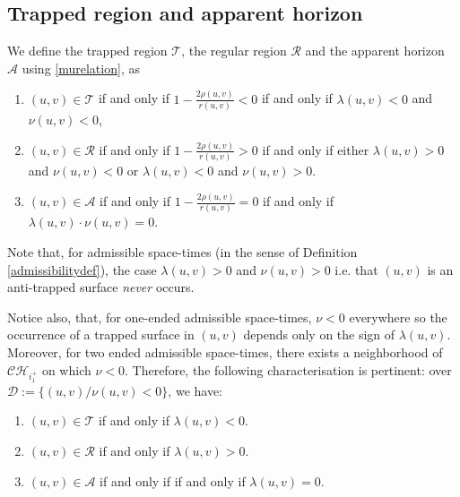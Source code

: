 \documentclass[10pt,a4paper]{article}
\theoremstyle{plain}
\theoremstyle{remark}
\newcommand{\A}{\mathcal{A}}
\newcommand{\R}{\mathcal{R}}
\newcommand{\T}{\mathcal{T}}
\theoremstyle{definition}
\theoremstyle{plain}
\theoremstyle{remark}
\theoremstyle{definition}
\numberwithin{equation}{section}
\begin{document}

\subsection{Trapped region and apparent horizon}


We define the trapped region $\mathcal{T}$, the regular region $\R$ and the apparent horizon $\A$ using \eqref{murelation}, as
\begin{enumerate}
	\item  \label{characttrapped} $(u,v) \in \T$   if and only if   $1-\frac{2\rho(u,v)}{r(u,v)}<0$ if and only if $\lambda(u,v)<0$ and  $\nu(u,v) <0$,
	\item $(u,v) \in \R$  if and only if   $1-\frac{2\rho(u,v)}{r(u,v)}>0$ if and only if either $\lambda(u,v)>0$ and $\nu(u,v)<0$ or $\lambda(u,v)<0$ and $\nu(u,v)>0$.
	\item $(u,v) \in \A$  if and only if   $1-\frac{2\rho(u,v)}{r(u,v)}=0$ if and only if $\lambda(u,v) \cdot \nu(u,v)=0$.
\end{enumerate}	

Note that, for admissible space-times (in the sense of Definition \ref{admissibilitydef}), the case  $\lambda(u,v)>0$ and $\nu(u,v)>0$ i.e. that $(u,v)$ is an anti-trapped surface \textit{never} occurs.

Notice also, that, for one-ended admissible space-times, $\nu <0$ everywhere so the occurrence of a trapped surface in $(u,v)$ depends only on the sign of $\lambda(u,v)$. Moreover, for two ended admissible space-times, there exists a neighborhood of $\mathcal{CH}_{i^+_1}$ on which $\nu<0$. Therefore, the following characterisation is pertinent: over $\mathcal{D}:=\{ (u,v)/ \nu(u,v)<0\}$, we have: \begin{enumerate}
	\item  $(u,v) \in \T$  if and only if $\lambda(u,v)<0$.
	\item $(u,v) \in \R$ if and only if $\lambda(u,v)>0$.
	\item $(u,v) \in \A$  if and only if   if and only if $\lambda(u,v)=0$.
\end{enumerate}	
\end{document}
